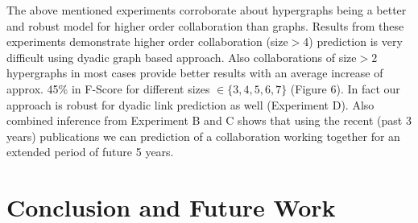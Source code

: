 \documentclass{sig-alternate}
\begin{document}
The above mentioned experiments corroborate about hypergraphs being a better and robust model for higher order collaboration than graphs. Results from these experiments demonstrate higher order collaboration (size$>$4) prediction is very difficult using dyadic graph based approach. Also collaborations of size$>2$ hypergraphs in most cases provide better results with an average increase of approx. 45\% in F-Score for different sizes $\in \{3,4,5,6,7\}$ (Figure 6). In fact our approach is robust for dyadic link prediction as well (Experiment D). Also combined inference from Experiment B and C shows that using the recent (past 3 years) publications we can prediction of a collaboration working together for an extended period of future 5 years. 



%

\section{Conclusion and  Future Work}
\end{document}
